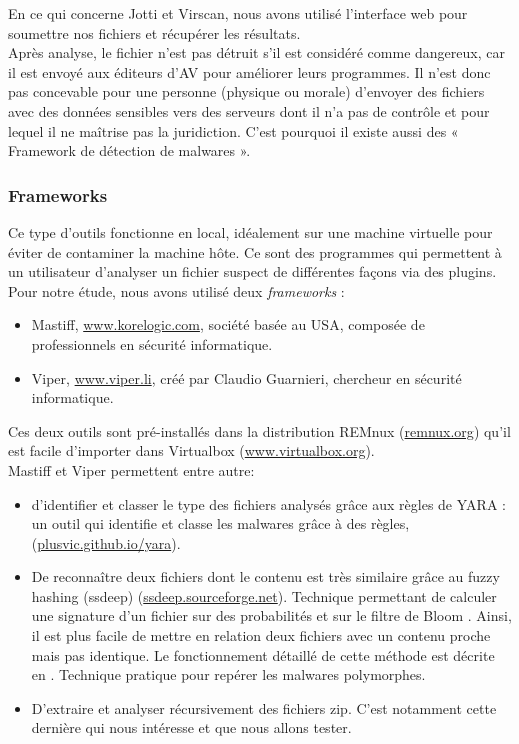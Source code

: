 \documentclass{svjour3}
\begin{document}
$ $\\
En ce qui concerne Jotti et Virscan, nous avons utilisé l'interface web pour soumettre nos fichiers et récupérer les résultats.\\
$ $\\
Après analyse, le fichier n'est pas détruit s'il est considéré comme dangereux, car il est envoyé aux éditeurs d'AV pour améliorer leurs programmes. Il n'est donc pas concevable pour une personne (physique ou morale) d'envoyer des fichiers avec des données sensibles vers des serveurs dont il n'a pas de contrôle et pour lequel il ne maîtrise pas la juridiction. C'est pourquoi il existe aussi des « Framework de détection de malwares ».\\

\subsubsection{Frameworks}
Ce type d'outils fonctionne en local, idéalement sur une machine virtuelle pour éviter de contaminer la machine hôte. Ce sont des programmes qui permettent à un utilisateur d'analyser un fichier suspect de différentes façons via des plugins. Pour notre étude, nous avons utilisé deux \textit{frameworks} : 
\label{2.2.2frameworks}
\begin{itemize}
\item Mastiff, \url{www.korelogic.com}, société basée au USA, composée de professionnels en sécurité informatique.
\item Viper, \url{www.viper.li}, créé par Claudio Guarnieri, chercheur en sécurité informatique.
\end{itemize}
Ces deux outils sont pré-installés dans la distribution REMnux (\url{remnux.org}) qu'il est facile d'importer dans Virtualbox (\url{www.virtualbox.org}).\\
Mastiff et Viper permettent entre autre:
\begin{itemize}
\item d’identifier et classer le type des fichiers analysés grâce aux règles de YARA : un outil qui identifie et classe les malwares grâce à des règles, (\url{plusvic.github.io/yara}).
\item De reconnaître deux fichiers dont le contenu est très similaire grâce au fuzzy hashing (ssdeep) (\url{ssdeep.sourceforge.net}). Technique permettant de calculer une signature d'un fichier sur des probabilités et sur le filtre de Bloom \cite{Bloom}. Ainsi, il est plus facile de mettre en relation deux fichiers avec un contenu proche mais pas identique. Le fonctionnement détaillé de cette méthode est décrite en \cite{Tournier}. Technique pratique pour repérer les malwares polymorphes.
\item D'extraire et analyser récursivement des fichiers zip. C'est notamment cette dernière qui nous intéresse et que nous allons tester.
\end{itemize}
\end{document}
